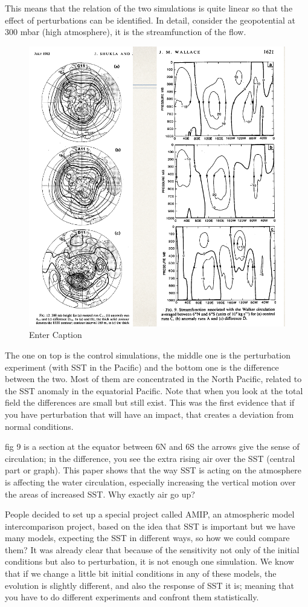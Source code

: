 This means that the relation of the two simulations is quite linear so that the effect of perturbations can be identified. In detail, consider the geopotential at 300 mbar (high atmosphere), it is the streamfunction of the flow. 
\begin{figure}
    \centering
    \includegraphics[width=0.5\linewidth]{uploads/Screenshot 2024-11-20 212453.png}
    \caption{Enter Caption}
    \label{fig:enter-label}
\end{figure}
The one on top is the control simulations, the middle one is the perturbation experiment (with SST in the Pacific) and the bottom one is the difference between the two. 
Most of them are concentrated in the North Pacific, related to the SST anomaly in the equatorial Pacific. Note that when you look at the total field the differences are small but still exist.
This was the first evidence that if you have perturbation that will have an impact, that creates a deviation from normal conditions.  

fig 9 is a section at the equator between 6N and 6S 
the arrows give the sense of circulation; in the difference, you see the extra rising air over the SST (central part or graph). This paper shows that the way SST is acting on the atmosphere is affecting the water circulation, especially increasing the vertical motion over the areas of increased SST. Why exactly air go up?

People decided to set up a special project called AMIP, an atmospheric model intercomparison project, based on the idea that SST is important but we have many models, expecting the SST in different ways, so how we could compare them? 
It was already clear that because of the sensitivity not only of the initial conditions but also to perturbation, it is not enough one simulation. 
We know that if we change a little bit initial conditions in any of these models, the evolution is slightly different, and also the response of SST it is; meaning that you have to do different experiments and confront them statistically. 

